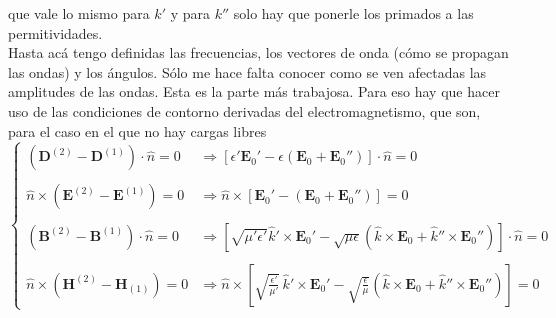 que vale lo mismo para $k'$ y para $k''$ solo hay que ponerle los primados a las permitividades.\\
\indent Hasta acá tengo definidas las frecuencias, los vectores de onda (cómo se propagan las ondas) y los ángulos. Sólo me hace falta conocer como se ven afectadas las amplitudes de las ondas. Esta es la parte más trabajosa. Para eso hay que hacer uso de las condiciones de contorno derivadas del electromagnetismo, que son, para el caso en el que no hay cargas libres
\begin{equation*}
    \left\{
        \begin{matrix}
            \left(
                \textbf{D}^{(2)} - \textbf{D}^{(1)}
            \right)\cdot \hat{n} = 0 
            &
            \Longrightarrow 
            \left[
                \epsilon'\textbf{E}_{0}' 
                -\epsilon 
                \left(
                    \textbf{E}_{0} + \textbf{E}_{0}''
                \right) 
            \right]\cdot \hat{n} = 0
            \\
            &\\
            \hat{n}\times 
            \left(
                \textbf{E}^{(2)} -\textbf{E}^{(1)}
            \right) = 0
            &
            \Longrightarrow
            \hat{n}\times
            \left[
                \textbf{E}_{0}'
                -
                \left(
                    \textbf{E}_{0} + \textbf{E}_{0}''
                \right)
            \right] = 0
            \\
            &\\
            \left(
                \textbf{B}^{(2)} - \textbf{B}^{(1)}
            \right)\cdot \hat{n} = 0 
            &
            \Longrightarrow 
            \left[
                \sqrt{\mu'\epsilon'}
                \hat{k}'\times \textbf{E}_{0}'
                - 
                \sqrt{\mu\epsilon}
                \left(
                    \hat{k}\times \textbf{E}_{0}
                    +
                    \hat{k}''\times \textbf{E}_{0}''
                \right)
            \right]\cdot \hat{n} = 0
            \\
            &\\
            \hat{n}\times 
            \left(
                \textbf{H}^{(2)} -\textbf{H}_{(1)}
            \right) = 0
            &
            \Longrightarrow
            \hat{n}\times
            \left[
                \sqrt{\frac{\epsilon'}{\mu'}}\,
                \hat{k}'\times \textbf{E}_{0}'
                -
                \sqrt{\frac{\epsilon}{\mu}}
                \left(
                    \hat{k}\times \textbf{E}_{0} 
                    +\hat{k}''\times \textbf{E}_{0}''
                \right)
            \right] = 0
        \end{matrix}
    \right.
\end{equation*}
